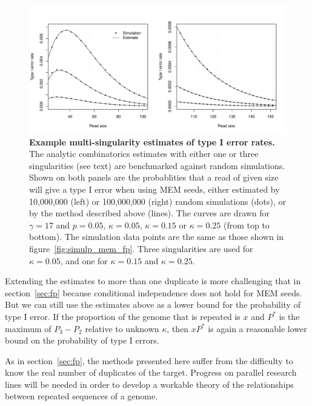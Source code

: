 \documentclass{article}
\begin{document}
\begin{figure}[h]
\centering
\includegraphics[scale=0.445]{simulp_mem_fp3.pdf}
\caption{\textbf{Example multi-singularity estimates of type I error
rates.} The analytic combinatorics estimates with either one or three
singularities (see text) are benchmarked against random simulations. Shown
on both panels are the probablities that a read of given size will give a
type I error when using MEM seeds, either estimated by 10,000,000 (left)
or 100,000,000 (right) random simulations (dots), or by the method
described above (lines). The curves are drawn for $\gamma=17$ and
$p=0.05$, $\kappa=0.05$, $\kappa=0.15$ or $\kappa=0.25$ (from top to
bottom). The simulation data points are the same as those shown in
figure~\ref{fig:simulp_mem_fp}. Three singularities are used for
$\kappa=0.05$, and one for $\kappa=0.15$ and $\kappa=0.25$.}
\label{fig:simulp_mem_fp3}
\end{figure}



Extending the estimates to more than one duplicate is more challenging
that in section~\ref{sec:fp} because conditional independence does not
hold for MEM seeds. But we can still use the estimates above as a lower
bound for the probability of type I error. If the proportion of the genome
that is repeated is $x$ and $P^*$ is the maximum of $P_3-P_2$ relative to
unknown $\kappa$, then $xP^*$ is again a reasonable lower bound on the
probability of type I errors.

As in section~\ref{sec:fp}, the methods presented here suffer from the
difficulty to know the real number of duplicates of the target. Progress
on parallel research lines will be needed in order to develop a workable
theory of the relationships between repeated sequences of a genome.



\end{document}
